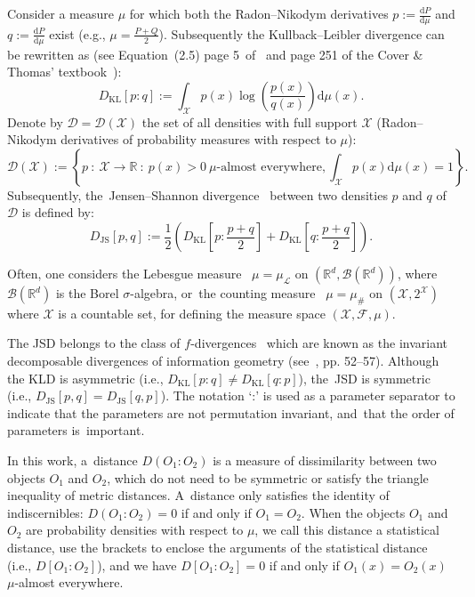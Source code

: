 \documentclass[entropy,article,accept,oneauthor,pdftex,entropy]{Definitions/mdpi}
\def\calL{\mathcal{L}}
\def\calB{\mathcal{B}}
\def\bbR{\mathbb{R}}
\def\JS{\mathrm{JS}}
\def\KL{\mathrm{KL}}
\def\dmu{\mathrm{d}\mu}
\def\calF{\mathcal{F}}
\def\calD{\mathcal{D}}
\def\calX{\mathcal{X}}
\def\dmu{\mathrm{d}\mu}
\begin{document}
Consider a measure $\mu$ for which both the Radon--Nikodym derivatives  $p:=\frac{\mathrm{d}P}{\mathrm{d}\mu}$ and 
$q:=\frac{\mathrm{d}P}{\mathrm{d}\mu}$ exist (e.g., $\mu=\frac{P+Q}{2}$).
Subsequently the Kullback--Leibler divergence can be rewritten as (see Equation~(2.5) page 5~of~\cite{Kullback-1997} and  page 251 of the Cover \& Thomas' textbook~\cite{CoverThomasIT-2012}):
\vspace{12pt}
\begin{equation}\label{eq:kld}
D_\KL[p:q]:=  \int_\calX p(x)\log\left(\frac{p(x)}{q(x)}\right)\dmu(x).
\end{equation}
Denote by $\calD=\calD(\calX)$ the set of all densities with full support $\calX$ (Radon--Nikodym derivatives of probability measures with respect to $\mu$):
$$
\calD(\calX) := \left\{p\ :\ \calX\rightarrow\bbR\ :\ p(x)>0\ \mbox{$\mu$-almost everywhere}, \int_\calX p(x)\dmu(x)=1\right\}.
$$
Subsequently, the~Jensen--Shannon divergence~\cite{JS-1991} between two densities $p$ and $q$ of $\calD$ is defined by:
\begin{equation}\label{eq:jsd}
D_\JS[p,q] :=  \frac{1}{2}\left(D_\KL\left[p:\frac{p+q}{2}\right]+D_\KL\left[q:\frac{p+q}{2}\right]\right).
\end{equation}

Often, one considers the Lebesgue measure~\cite{Billingsley-2008} $\mu=\mu_\calL$ on $(\bbR^d,\calB(\bbR^d))$, where $\calB(\bbR^d)$ is the Borel $\sigma$-algebra, or~the counting measure~\cite{Billingsley-2008} $\mu=\mu_\#$ on $(\calX,2^\calX)$ where $\calX$ is a countable set, for defining the measure space $(\calX,\calF,\mu)$.

 
The JSD belongs to the class of  $f$-divergences~\cite{fdivMorimoto-1963,Csiszar-1964,fdiv-AliSilvey-1966} which are known as the invariant decomposable divergences of information geometry (see~\cite{IG-2016}, pp. 52--57). 
Although the KLD is asymmetric (i.e., $D_\KL[p:q]\not= D_\KL[q:p]$), the~JSD is symmetric (i.e., $D_\JS[p,q] =D_\JS[q,p]$).
The notation `:' is used as a parameter separator to indicate that the parameters are not permutation invariant, and~that the order of parameters is~important. 




In this work, a~distance $D(O_1:O_2)$ is a measure of dissimilarity between two objects $O_1$ and $O_2$, which do not need to be symmetric or satisfy the triangle inequality of metric distances. A~distance only satisfies the identity of indiscernibles:
$D(O_1:O_2)=0$ if and only if $O_1=O_2$.
 When the objects $O_1$ and $O_2$ are probability densities with respect to $\mu$, we call this distance a statistical distance, use the brackets to enclose the arguments of the statistical distance (i.e., $D[O_1:O_2]$), and we have $D[O_1:O_2]=0$ if and only if $O_1(x)=O_2(x)$ $\mu$-almost everywhere.
\end{document}
